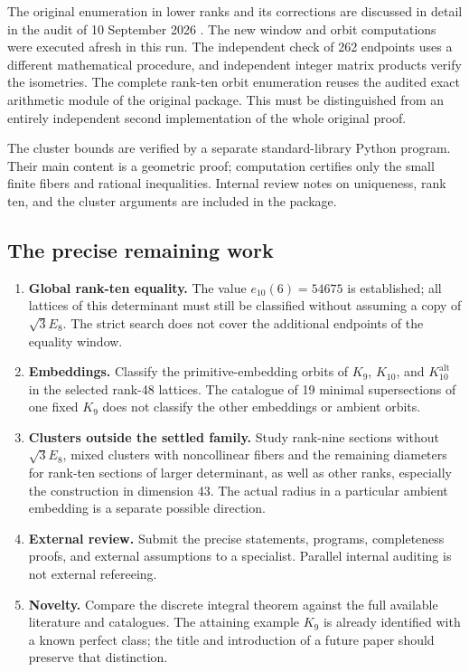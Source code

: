 \documentclass[11pt,a4paper]{article}
\theoremstyle{remark}\newtheorem{remark}[theorem]{Remark}
\newcommand{\Kalt}{K_{10}^{\mathrm{alt}}}
\begin{document}
The original enumeration in lower ranks and its corrections are discussed in detail in the audit of 10 September 2026 \cite{audit}. The new window and orbit computations were executed afresh in this run. The independent check of 262 endpoints uses a different mathematical procedure, and independent integer matrix products verify the isometries. The complete rank-ten orbit enumeration reuses the audited exact arithmetic module of the original package. This must be distinguished from an entirely independent second implementation of the whole original proof.

The cluster bounds are verified by a separate standard-library Python program. Their main content is a geometric proof; computation certifies only the small finite fibers and rational inequalities. Internal review notes on uniqueness, rank ten, and the cluster arguments are included in the package.

\Needspace{8cm}
\subsection{The precise remaining work}

\begin{enumerate}
\item \textbf{Global rank-ten equality.} The value $e_{10}(6)=54675$ is established; all lattices of this determinant must still be classified without assuming a copy of $\sqrt3E_8$. The strict search does not cover the additional endpoints of the equality window.
\item \textbf{Embeddings.} Classify the primitive-embedding orbits of $K_9$, $K_{10}$, and $\Kalt$ in the selected rank-48 lattices. The catalogue of 19 minimal supersections of one fixed $K_9$ does not classify the other embeddings or ambient orbits.
\item \textbf{Clusters outside the settled family.} Study rank-nine sections without $\sqrt3E_8$, mixed clusters with noncollinear fibers and the remaining diameters for rank-ten sections of larger determinant, as well as other ranks, especially the construction in dimension 43. The actual radius in a particular ambient embedding is a separate possible direction.
\item \textbf{External review.} Submit the precise statements, programs, completeness proofs, and external assumptions to a specialist. Parallel internal auditing is not external refereeing.
\item \textbf{Novelty.} Compare the discrete integral theorem against the full available literature and catalogues. The attaining example $K_9$ is already identified with a known perfect class; the title and introduction of a future paper should preserve that distinction.
\end{enumerate}
\end{document}
